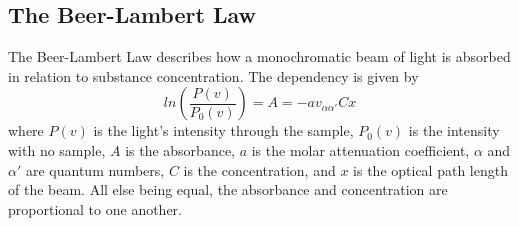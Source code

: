 \documentclass[reprint,amsmath,amssymb,aps, prl]{revtex4-2}
\begin{document}

\subsection{The Beer-Lambert Law}
The Beer-Lambert Law describes how a monochromatic beam of light is absorbed in relation to substance concentration. The dependency is given by
\begin{equation} \label{eq:BeerLambert}
ln\left(\frac{P(v)}{P_{0}(v)}\right)=A=-av_{\alpha\alpha'}Cx
\end{equation}
where $P(v)$ is the light's intensity through the sample, $P_{0}(v)$ is the intensity with no sample, $A$ is the absorbance, $a$ is the molar attenuation coefficient, $\alpha$ and $\alpha'$ are quantum numbers, $C$ is the concentration, and $x$ is the optical path length of the beam. All else being equal, the absorbance and concentration are proportional to one another.
\end{document}
